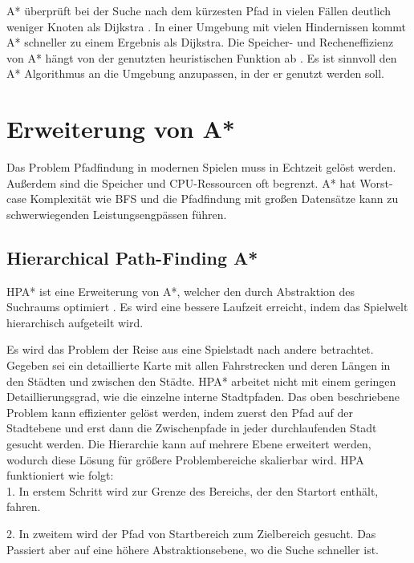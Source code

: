 A* überprüft bei der Suche nach dem kürzesten Pfad in vielen Fällen deutlich weniger Knoten als Dijkstra \cite[S.20f]{compare}. In einer Umgebung mit vielen Hindernissen kommt A* schneller zu einem Ergebnis als Dijkstra. Die Speicher- und Recheneffizienz von A* hängt von der genutzten heuristischen Funktion ab \cite[S.237]{Noo15}. Es ist sinnvoll den A* Algorithmus an die Umgebung anzupassen, in der er genutzt werden soll.

\section{Erweiterung von A*}
Das Problem Pfadfindung in modernen Spielen muss in Echtzeit gelöst werden. Außerdem sind die Speicher und CPU-Ressourcen oft begrenzt. A* hat Worst-case Komplexität wie BFS \cite{You19} und die Pfadfindung mit großen Datensätze kann zu schwerwiegenden Leistungsengpässen führen.


\subsection{Hierarchical Path-Finding A*}
HPA* ist eine Erweiterung von A*, welcher den durch Abstraktion des Suchraums optimiert \cite{Bot04}. Es wird eine bessere Laufzeit erreicht, indem das Spielwelt hierarchisch aufgeteilt wird.

Es wird das Problem der Reise aus eine Spielstadt nach andere betrachtet. Gegeben sei ein detaillierte Karte mit allen Fahrstrecken und deren Längen in den Städten und zwischen den Städte. HPA* arbeitet nicht mit einem geringen Detaillierungsgrad, wie die einzelne interne Stadtpfaden. Das oben beschriebene Problem kann effizienter gelöst werden, indem zuerst den Pfad auf der Stadtebene und erst dann die Zwischenpfade in jeder durchlaufenden Stadt gesucht werden. Die Hierarchie kann auf mehrere Ebene erweitert werden, wodurch diese Lösung für größere Problembereiche skalierbar wird. HPA funktioniert wie folgt:\\

1. In erstem Schritt wird zur Grenze des Bereichs, der den Startort enthält, fahren.

2. In zweitem wird der Pfad von Startbereich zum Zielbereich gesucht. Das Passiert aber auf eine höhere Abstraktionsebene, wo die Suche schneller ist.

